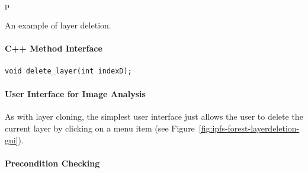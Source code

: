 \begin{stusubfig}{p}
	\hspace{8mm}%
\caption{An example of layer deletion.}
\label{fig:ipfs-forest-layerdeletion}
\end{stusubfig}

\paragraph{C++ Method Interface}

\begin{lstlisting}[style=Prototype]
void delete_layer(int indexD);
\end{lstlisting}

\paragraph{User Interface for Image Analysis}

As with layer cloning, the simplest user interface just allows the user to delete the current layer by clicking on a menu item (see Figure~\ref{fig:ipfs-forest-layerdeletion-gui}).


\paragraph{Precondition Checking}

